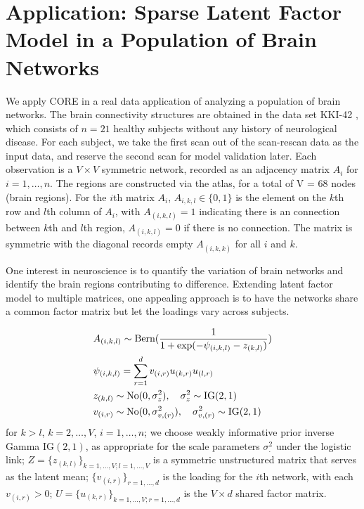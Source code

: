 \documentclass[10pt,fleqn]{article} \pdfoutput=1
\DeclareMathOperator{\1}{\mathbbm{1}} \DeclareMathOperator{\bigO}{\mc O}
\begin{document}
\section{Application: Sparse Latent Factor Model in a Population of Brain Networks}

We apply CORE in a real data application of analyzing a population of brain
networks. The brain connectivity structures are obtained in the data set
KKI-42 \citep{landman2011multi}, which consists of $n=21$ healthy subjects
without any history of neurological disease. For each subject, we take the
first scan out of the scan-rescan data as the input data, and reserve the
second scan for model validation later. Each observation is a $V\times V$
symmetric network, recorded as an adjacency matrix $A_i$ for
$i=1,\ldots,n$. The regions are constructed via the
\cite{desikan2006automated} atlas, for a total of V = 68 nodes (brain regions).  For the $i$th matrix
$A_i$, $A_{i,k,l} \in \{0,1\}$ is the element on the $k$th row and $l$th
column of $A_i$, with $A_{(i,k,l)}=1$ indicating there is an connection
between $k$th and $l$th region, $A_{(i,k,l)}=0$ if there is no connection.
The matrix is symmetric with the diagonal records empty $A_{(i,k,k)}$ for
all $i$ and $k$.

One interest in neuroscience is to quantify the variation of
brain networks and identify the brain regions contributing to difference.
Extending latent factor model to multiple matrices, one appealing approach is
to have the networks share a common factor matrix but let the loadings
vary across subjects.

\begin{equation*} \begin{aligned}
& A_{(i,k,l)} \sim \text{Bern}( \frac{1}{1+ \exp(-\psi_{(i,k,l)}-
z_{(k,l)})})                                                             \\ & \psi_{(i,k,l)} = \sum_{r=1}^{d}  v_{(i,r)} u_{(k,r)}
u_{(l,r)}                                                                \\
& z_{(k,l)} \sim \operatorname{No}(0,\sigma^2_z),\quad  \sigma^2_z\sim \text{IG}(2,1) \\
& v_{(i,r)} \sim \operatorname{No}(0,\sigma^2_{v,(r)}), \quad
\sigma^2_{v,(r)} \sim \text{IG}(2,1)
\end{aligned} \end{equation*}
for
$k>l$, $k=2,\ldots, V$, $i=1,\ldots,n$;  we choose weakly informative prior inverse
Gamma $\text{IG}(2,1)$, as appropriate for the scale parameters $\sigma^2_.$ under the logistic
link; $Z=\{z_{(k,l)}\}_{k=1,\ldots,V;l=1,\ldots,V}$ is a symmetric unstructured
matrix that serves as the latent mean; $\{ v_{(i,r)}\}_{r=1,\ldots,d}$ is
the loading for the $i$th network, with each $v_{(i,r)}>0$; $U=\{ u_{(k,r)}\}_{ k=1,\ldots,V;r=1,\ldots,d}$ is the $V\times d$ shared factor matrix.
\end{document}
